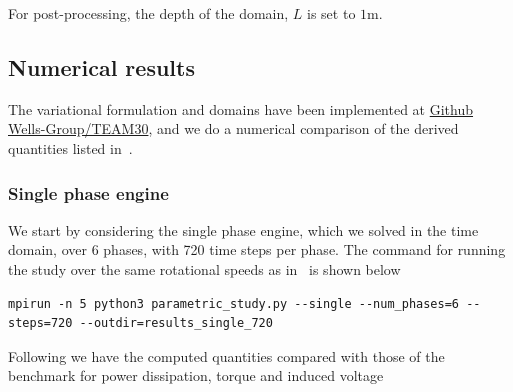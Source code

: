\documentclass{article}
\begin{document}
For post-processing, the depth of the domain, $L$ is set to $1$m.

\subsection{Numerical results}

The variational formulation and domains have been implemented at
\href{https://github.com/Wells-Group/TEAM30/}{Github
Wells-Group/TEAM30}, and we do a numerical comparison of the derived
quantities listed in~\cite{daveyteam30}.

\subsubsection{Single phase engine}

We start by considering the single phase engine, which we solved in the
time domain, over $6$ phases, with 720 time steps per phase. The command
for running the study over the same rotational speeds as
in~\cite{daveyteam30} is shown below
\begin{lstlisting}[style=pythoncustom, numbers=none]
mpirun -n 5 python3 parametric_study.py --single --num_phases=6 --steps=720 --outdir=results_single_720
\end{lstlisting}

Following we have the computed quantities compared with those of the
benchmark for power dissipation, torque and induced voltage

\end{document}
